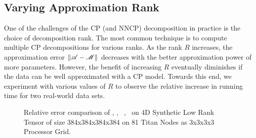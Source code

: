 \subsection{Varying Approximation Rank}

One of the challenges of the CP (and NNCP) decomposition in practice is the choice of decomposition rank.
The most common technique is to compute multiple CP decompositions for various ranks.
As the rank $R$ increases, the approximation error  $\|\TA - \T{M}\|$ decreases with the better approximation power of more parameters. 
However, the benefit of increasing $R$ eventually diminishes if the data can be well approximated with a CP model.
Towards this end, we experiment with various values of $R$ to observe the relative increase in running time for two real-world data sets. 


\begin{figure}
\caption{Relative error comparison of \MU, \HALS, \BPP\, \ADMM, \Nestrov\ on 4D Synthetic Low Rank Tensor of size 384x384x384x384 on 81 Titan Nodes as 3x3x3x3 Processor Grid.}
\label{fig:convergencelowrank}
\end{figure}

